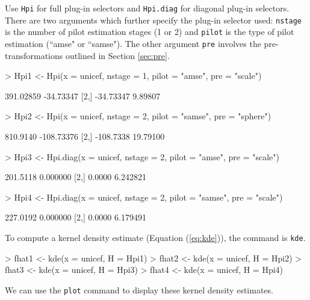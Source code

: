 \documentclass[a4paper,11pt]{article}
\begin{document}
Use \texttt{Hpi} for 
full plug-in selectors and \texttt{Hpi.diag} for diagonal plug-in selectors.
There are two arguments which further specify the plug-in selector
used: \texttt{nstage} is the number of pilot estimation stages (1 or 2)
and \texttt{pilot} is the type of pilot estimation (``amse" or ``samse").
The other argument \texttt{pre} involves the pre-transformations outlined
in Section \ref{sec:pre}. 
\begin{Schunk}
\begin{Sinput}
> Hpi1 <- Hpi(x = unicef, nstage = 1, pilot = "amse", pre = "scale")
\end{Sinput}
\begin{Soutput}
          [,1]      [,2]
[1,] 391.02859 -34.73347
[2,] -34.73347   9.89807
\end{Soutput}
\begin{Sinput}
> Hpi2 <- Hpi(x = unicef, nstage = 2, pilot = "samse", pre = "sphere")
\end{Sinput}
\begin{Soutput}
          [,1]       [,2]
[1,]  810.9140 -108.73376
[2,] -108.7338   19.79100
\end{Soutput}
\begin{Sinput}
> Hpi3 <- Hpi.diag(x = unicef, nstage = 2, pilot = "amse", pre = "scale")
\end{Sinput}
\begin{Soutput}
         [,1]     [,2]
[1,] 201.5118 0.000000
[2,]   0.0000 6.242821
\end{Soutput}
\begin{Sinput}
> Hpi4 <- Hpi.diag(x = unicef, nstage = 2, pilot = "samse", pre = "scale")
\end{Sinput}
\begin{Soutput}
         [,1]     [,2]
[1,] 227.0192 0.000000
[2,]   0.0000 6.179491
\end{Soutput}
\end{Schunk}
To compute a kernel density estimate (Equation (\ref{eq:kde})), the 
command is \texttt{kde}.  
\begin{Schunk}
\begin{Sinput}
> fhat1 <- kde(x = unicef, H = Hpi1)
> fhat2 <- kde(x = unicef, H = Hpi2)
> fhat3 <- kde(x = unicef, H = Hpi3)
> fhat4 <- kde(x = unicef, H = Hpi4)
\end{Sinput}
\end{Schunk}
We can use the \texttt{plot} command to display these
kernel density estimates. %
\end{document}
